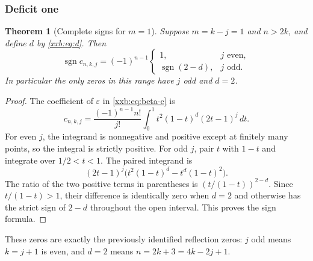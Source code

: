 \documentclass[11pt,a4paper]{article}
\numberwithin{equation}{section}
\newtheorem{theorem}{Theorem}[section]
\theoremstyle{definition}
\theoremstyle{remark}
\theoremstyle{plain}
\DeclareMathOperator{\sgn}{sgn}
\begin{document}
\subsubsection{Deficit one}
\begin{theorem}[Complete signs for $m=1$]\label{xxb:thm:m1}
Suppose $m=k-j=1$ and $n>2k$, and define $d$ by \eqref{xxb:eq:d}. Then
\begin{equation}\label{xxb:eq:m1-sign}
 \sgn c_{n,k,j}=(-1)^{n-1}
 \begin{cases}
 1,&j\text{ even},\\
 \sgn(2-d),&j\text{ odd}.
 \end{cases}
\end{equation}
In particular the only zeros in this range have $j$ odd and $d=2$.
\end{theorem}
\begin{proof}
The coefficient of $\varepsilon$ in \eqref{xxb:eq:beta-c} is
\begin{equation}\label{xxb:eq:m1-integral}
 c_{n,k,j}=\frac{(-1)^{n-1}n!}{j!}
 \int_0^1t^2(1-t)^d(2t-1)^j\,dt.
\end{equation}
For even $j$, the integrand is nonnegative and positive except at finitely
many points, so the integral is strictly positive. For odd $j$, pair $t$
with $1-t$ and integrate over $1/2<t<1$. The paired integrand is
\[
 (2t-1)^j\bigl(t^2(1-t)^d-t^d(1-t)^2\bigr).
\]
The ratio of the two positive terms in parentheses is
$(t/(1-t))^{2-d}$. Since $t/(1-t)>1$, their difference is identically
zero when $d=2$ and otherwise has the strict sign of $2-d$ throughout
the open interval. This proves the sign formula.
\end{proof}
These zeros are exactly the previously identified reflection zeros:
$j$ odd means $k=j+1$ is even, and $d=2$ means
$n=2k+3=4k-2j+1$.
\end{document}
